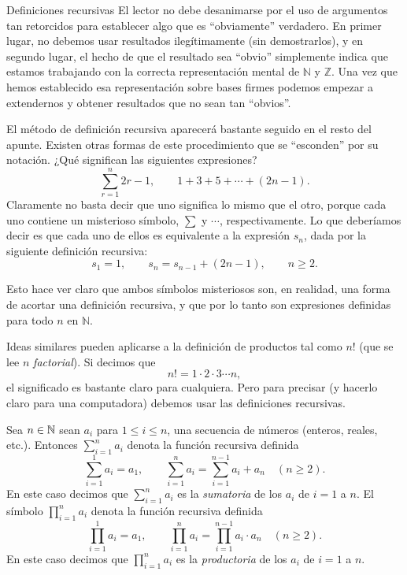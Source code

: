 \begin{section}{Definiciones recursivas}
El lector no debe desanimarse por el uso de argumentos tan retorcidos para establecer algo que es ``obviamente'' verdadero. En primer lugar, no debemos usar resultados ilegítimamente (sin demostrarlos), y en segundo lugar, el hecho de que el resultado sea ``obvio'' simplemente indica que estamos trabajando con la correcta representación mental de $\mathbb N$ y $\mathbb Z$. Una vez que hemos establecido esa representación sobre bases firmes podemos empezar a extendernos y obtener resultados que no sean tan ``obvios''.

El método de definición recursiva aparecerá bastante seguido en el resto del apunte. Existen otras formas de este procedimiento que se ``esconden'' por su notación. ¿Qué significan las siguientes expresiones?
$$
\sum_{r=1}^{n} 2r-1,\qquad 1+3+5+\cdots +(2n-1).
$$
Claramente no basta decir que uno significa lo mismo que el otro, porque cada uno contiene un misterioso símbolo, $\sum$ y $\cdots$, respectivamente. Lo que deberíamos decir es que cada uno de ellos es equivalente a la expresión $s_n$, dada por la siguiente definición recursiva:
$$
s_1= 1, \qquad s_n = s_{n-1} +(2n-1), \qquad n\ge 2.
$$

Esto hace ver claro que ambos símbolos misteriosos son, en realidad, una forma de acortar una definición recursiva, y que por lo tanto son expresiones definidas para todo $n$ en $\mathbb N$.

Ideas similares pueden aplicarse a la definición de productos tal como $n!$ (que se lee $n$ \textit{factorial}). Si decimos que
$$
n!=1 \cdot 2 \cdot 3 \cdots n,
$$
el significado es bastante claro para cualquiera. Pero para precisar (y hacerlo claro para una computadora) debemos usar las definiciones recursivas.

\begin{definicion} Sea $n \in {\mathbb N}$ sean $a_i$  para $1 \le i \le n$, una secuencia de números (enteros, reales, etc.). Entonces $\sum_{i=1}^{n} a_i$  denota la función recursiva definida  
    $$
    \sum_{i=1}^{1} a_i= a_1, \qquad \sum_{i=1}^{n} a_i = \sum_{i=1}^{n-1} a_i+ a_{n} \quad (n\ge 2).
    $$
    En  este caso  decimos que  $\sum_{i=1}^{n} a_i$ es la \textit{sumatoria} de los $a_i$ de $i=1$  a $n$. El símbolo $\prod_{i=1}^{n} a_i$ denota la función recursiva definida  
    $$
    \prod_{i=1}^{1} a_i= a_1, \qquad \prod_{i=1}^{n} a_i = \prod_{i=1}^{n-1} a_i \cdot  a_{n} \quad (n\ge 2).
    $$
    En  este caso  decimos que  $\prod_{i=1}^{n} a_i$ es la \textit{productoria} de los $a_i$ de $i=1$  a $n$. 
\end{definicion}




\end{section}
